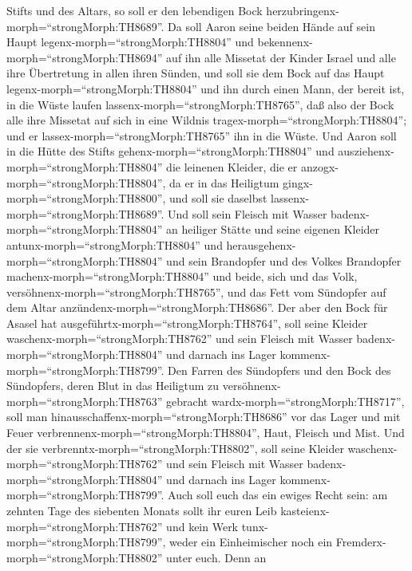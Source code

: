 Stifts und des Altars, so soll er den lebendigen Bock
herzubringenx-morph=``strongMorph:TH8689''.  Da soll Aaron
seine beiden Hände auf sein Haupt legenx-morph=``strongMorph:TH8804''
und bekennenx-morph=``strongMorph:TH8694'' auf ihn alle Missetat der
Kinder Israel und alle ihre Übertretung in allen ihren Sünden, und soll
sie dem Bock auf das Haupt legenx-morph=``strongMorph:TH8804'' und ihn
durch einen Mann, der bereit ist, in die Wüste laufen
lassenx-morph=``strongMorph:TH8765'',  daß also der Bock
alle ihre Missetat auf sich in eine Wildnis
tragex-morph=``strongMorph:TH8804''; und er
lassex-morph=``strongMorph:TH8765'' ihn in die Wüste.  Und
Aaron soll in die Hütte des Stifts gehenx-morph=``strongMorph:TH8804''
und ausziehenx-morph=``strongMorph:TH8804'' die leinenen Kleider, die er
anzogx-morph=``strongMorph:TH8804'', da er in das Heiligtum
gingx-morph=``strongMorph:TH8800'', und soll sie daselbst
lassenx-morph=``strongMorph:TH8689''.  Und soll sein
Fleisch mit Wasser badenx-morph=``strongMorph:TH8804'' an heiliger
Stätte und seine eigenen Kleider antunx-morph=``strongMorph:TH8804'' und
herausgehenx-morph=``strongMorph:TH8804'' und sein Brandopfer und des
Volkes Brandopfer machenx-morph=``strongMorph:TH8804'' und beide, sich
und das Volk, versöhnenx-morph=``strongMorph:TH8765'',  und
das Fett vom Sündopfer auf dem Altar
anzündenx-morph=``strongMorph:TH8686''.  Der aber den Bock
für Asasel hat ausgeführtx-morph=``strongMorph:TH8764'', soll seine
Kleider waschenx-morph=``strongMorph:TH8762'' und sein Fleisch mit
Wasser badenx-morph=``strongMorph:TH8804'' und darnach ins Lager
kommenx-morph=``strongMorph:TH8799''.  Den Farren des
Sündopfers und den Bock des Sündopfers, deren Blut in das Heiligtum zu
versöhnenx-morph=``strongMorph:TH8763'' gebracht
wardx-morph=``strongMorph:TH8717'', soll man
hinausschaffenx-morph=``strongMorph:TH8686'' vor das Lager und mit Feuer
verbrennenx-morph=``strongMorph:TH8804'', Haut, Fleisch und Mist.
 Und der sie verbrenntx-morph=``strongMorph:TH8802'', soll
seine Kleider waschenx-morph=``strongMorph:TH8762'' und sein Fleisch mit
Wasser badenx-morph=``strongMorph:TH8804'' und darnach ins Lager
kommenx-morph=``strongMorph:TH8799''.  Auch soll euch das
ein ewiges Recht sein: am zehnten Tage des siebenten Monats sollt ihr
euren Leib kasteienx-morph=``strongMorph:TH8762'' und kein Werk
tunx-morph=``strongMorph:TH8799'', weder ein Einheimischer noch ein
Fremderx-morph=``strongMorph:TH8802'' unter euch.  Denn an
